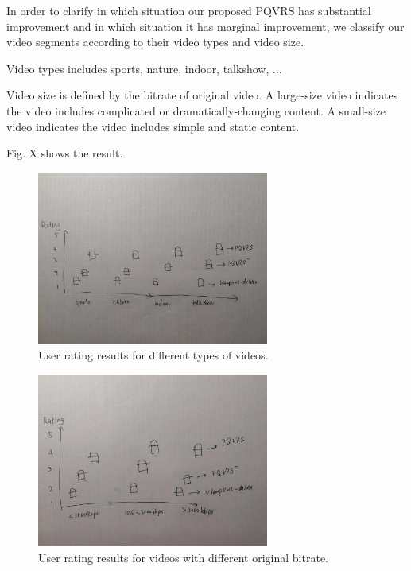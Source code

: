 In order to clarify in which situation our proposed PQVRS has substantial improvement and in which situation it has marginal improvement, we classify our video segments according to their video types and video size.

Video types includes sports, nature, indoor, talkshow, ...

Video size is defined by the bitrate of original video. A large-size video indicates the video includes complicated or dramatically-changing content. A small-size video indicates the video includes simple and static content.

Fig. X shows the result.

    \begin{figure}
  \centering
  \includegraphics[width=3in]{images/rating_type.jpeg}
  \caption{User rating results for different types of videos.}
  \label{rating_res}
  \end{figure}
  
      \begin{figure}
  \centering
  \includegraphics[width=3in]{images/rating_bitrate.jpeg}
  \caption{User rating results for videos with different original bitrate.}
  \label{rating_res}
  \end{figure}
  